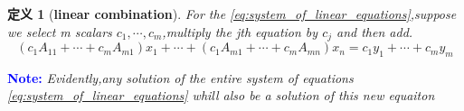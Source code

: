 \documentclass[11pt, a4paper, oneside,UTF8]{ctexbook}
\newenvironment{note}
{\par\textcolor{blue}{\bfseries Note:}\itshape}
{\par}
\newtheorem{definition}{\indent 定义}[section]
\begin{document}
\begin{definition}[\textbf{linear combination}]
  For the \ref{eq:system_of_linear_equations},suppose we select m scalars $c_1,\cdots,c_m$,multiply the jth equation by $c_j$ and then add.
  \begin{displaymath}
      (c_1A_{11}+\cdots+c_mA_{m1})x_1+\cdots+(c_1A_{m1}+\cdots+c_mA_{mn})x_n = c_1y_1+\cdots+c_my_m 
  \end{displaymath}
\end{definition}

\begin{note}
    Evidently,any solution of the entire system of equations \ref{eq:system_of_linear_equations} whill also be a solution of this new equaiton
\end{note}
\end{document}
